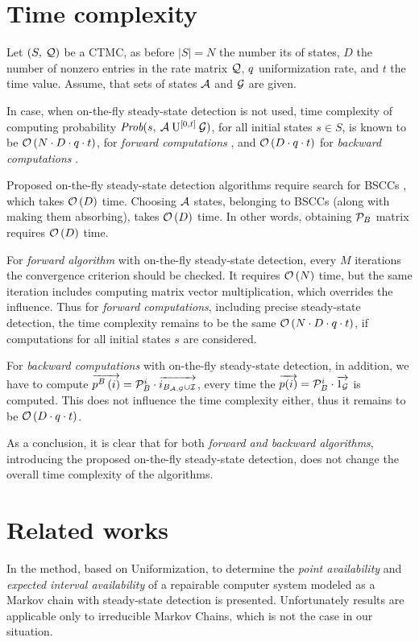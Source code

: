 \documentclass[a4paper,11pt]{article}
\newcommand{\Section}[1]{\section{#1}}
\begin{document}
 \Section{Time complexity \label{s:timec}}
 		Let $\left( S,\: \mathcal{Q} \right)$ be a CTMC, as before $| S | = N$ the number its of states, $D$ the number of nonzero entries in the rate matrix $\mathcal{Q}$, $q$ uniformization rate, and $t$ the time value. Assume, that sets of states $\mathcal{A}$ and $\mathcal{G}$ are given.
 
 		In case, when on-the-fly steady-state detection is not used, time complexity of computing probability $\mbox{\it Prob}(s, \: \mathcal{A} \: \mathrm{U}^{[0,t]} \: \mathcal{G} )$, for all initial states $s \in S$, is known to be $\mathcal{O}\left( N \cdot D \cdot q \cdot t \right)$, for \emph{forward computations} \cite{BaierHHK_CAV00}, and $\mathcal{O}\left( D \cdot q \cdot t \right)$ for \emph{backward computations} \cite{KatoenKNP_LNCS01}.
 
 		Proposed on-the-fly steady-state detection algorithms require search for BSCCs \cite{Tarjan_SIAMJC72}, which takes $\mathcal{O}\left( D \right)$ time. Choosing $\mathcal{A}$ states, belonging to BSCCs (along with making them absorbing), takes $\mathcal{O}\left( D \right)$ time. In other words, obtaining $\mathcal{P}_{B}$ matrix requires $\mathcal{O}\left( D \right)$ time.
		
		For \emph{forward algorithm} with on-the-fly steady-state detection, every $M$ iterations the convergence criterion should be checked. It requires $\mathcal{O}\left( N \right)$ time, but the same iteration includes computing matrix vector multiplication, which overrides the influence. Thus for \emph{forward computations}, including precise steady-state detection, the time complexity remains to be the same $\mathcal{O}\left( N \cdot D \cdot q \cdot t \right)$, if computations for all initial states $s$ are considered.
 
 		For \emph{backward computations} with on-the-fly steady-state detection, in addition, we have to compute $\overrightarrow{p^{B}\left( i \right)} = \mathcal{P}_{B}^{i} \cdot \overrightarrow {i_{B_{ \mathcal{A}, \mathcal{G} } \cup \mathcal{I}}}$, every time the $\overrightarrow{p(i)} = \mathcal{P}_{B}^{i} \cdot \overrightarrow{1_{\mathcal{G}}}$ is computed. This does not influence the time complexity either, thus it remains to be $\mathcal{O}\left( D \cdot q \cdot t \right)$.
 
		As a conclusion, it is clear that for both \emph{forward and backward algorithms}, introducing the proposed on-the-fly steady-state detection, does not change the overall time complexity of the algorithms. 
		
 \Section{Related works \label{s:related}}
 		In \cite{Sericola_TC99} the method, based on Uniformization, to determine the \emph{point availability} and \emph{expected interval availability} of a repairable computer system modeled as a Markov chain with steady-state detection is presented. Unfortunately results are applicable only to irreducible Markov Chains, which is not the case in our situation.
	
\end{document}
